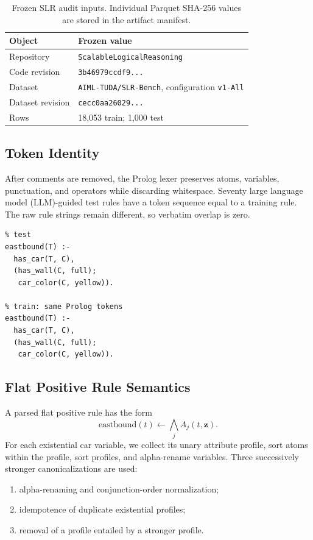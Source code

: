 \begin{table}[H]
\caption{Frozen SLR audit inputs.  Individual Parquet SHA-256 values are stored
in the artifact manifest.}
\label{tab:slr-source}
\centering
\small
\begin{tabular}{p{0.78in}p{2.0in}}
\toprule
Object & Frozen value \\
\midrule
Repository & \texttt{ScalableLogicalReasoning} \\
Code revision & \texttt{3b46979ccdf9...} \\
Dataset & \texttt{AIML-TUDA/SLR-Bench}, configuration \texttt{v1-All} \\
Dataset revision & \texttt{cecc0aa26029...} \\
Rows & 18,053 train; 1,000 test \\
\bottomrule
\end{tabular}
\end{table}

\subsection{Token Identity}

After comments are removed, the Prolog lexer preserves atoms, variables,
punctuation, and operators while discarding whitespace.  Seventy large language
model (LLM)-guided test rules have a token sequence equal to a training rule.
The raw rule strings remain different, so verbatim overlap is zero.

\begin{verbatim}
% test
eastbound(T) :-
  has_car(T, C),
  (has_wall(C, full);
   car_color(C, yellow)).

% train: same Prolog tokens
eastbound(T) :-
  has_car(T, C),
  (has_wall(C, full);
   car_color(C, yellow)).
\end{verbatim}

\subsection{Flat Positive Rule Semantics}

A parsed flat positive rule has the form
\begin{equation}
\mathrm{eastbound}(t)\leftarrow
\bigwedge_j A_j(t,\mathbf z).
\end{equation}
For each existential car variable, we collect its unary attribute profile,
sort atoms within the profile, sort profiles, and alpha-rename variables.
Three successively stronger canonicalizations are used:
\begin{enumerate}
    \item alpha-renaming and conjunction-order normalization;
    \item idempotence of duplicate existential profiles;
    \item removal of a profile entailed by a stronger profile.
\end{enumerate}

